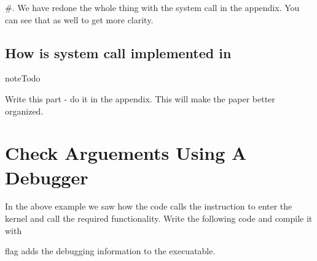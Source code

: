 \documentclass[letterpaper,10pt,english]{sphinxmanual}
\begin{document}
\#.  We have redone the whole thing with the  system call in the
appendix. You can see that as well to get more clarity.


\subsection{How is  system call implemented in }
\label{\detokenize{06_setting_up_arguements:how-is-write-system-call-implemented-in-glibc}}
\begin{sphinxadmonition}{note}{Todo}

Write this part - do it in the appendix. This will make the paper better organized.
\end{sphinxadmonition}


\section{Check Arguements Using A Debugger}
\label{\detokenize{06_setting_up_arguements:check-arguements-using-a-debugger}}
In the above example we saw how the code calls the  instruction to
enter the kernel and call the required functionality.  Write the following code
and compile it with 

 flag adds the debugging information to the execuatable.
\end{document}
